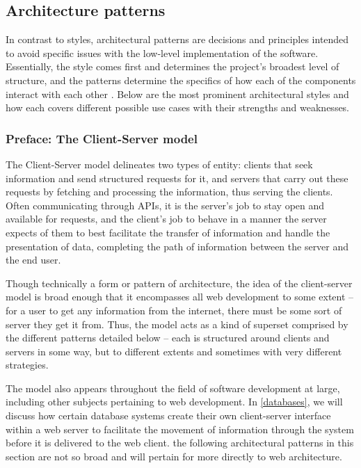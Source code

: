 \subsection{Architecture patterns}

In contrast to styles, architectural patterns are decisions and principles intended to avoid specific issues with the low-level implementation of the software. Essentially, the style comes first and determines the project's broadest level of structure, and the patterns determine the specifics of how each of the components interact with each other \cite{ghidersa_software_2022}. Below are the most prominent architectural styles and how each covers different possible use cases with their strengths and weaknesses.

\subsubsection{Preface: The Client-Server model}

The Client-Server model delineates two types of entity: clients that seek information and send structured requests for it, and servers that carry out these requests by fetching and processing the information, thus serving the clients. Often communicating through APIs, it is the server's job to stay open and available for requests, and the client's job to behave in a manner the server expects of them to best facilitate the transfer of information and handle the presentation of data, completing the path of information between the server and the end user.

Though technically a form or pattern of architecture, the idea of the client-server model is broad enough that it encompasses all web development to some extent -- for a user to get any information from the internet, there must be some sort of server they get it from. Thus, the model acts as a kind of superset comprised by the different patterns detailed below -- each is structured around clients and servers in some way, but to different extents and sometimes with very different strategies.

The model also appears throughout the field of software development at large, including other subjects pertaining to web development. In \autoref{databases}, we will discuss how certain database systems create their own client-server interface within a web server to facilitate the movement of information through the system before it is delivered to the web client. the following architectural patterns in this section are not so broad and will pertain for more directly to web architecture.

